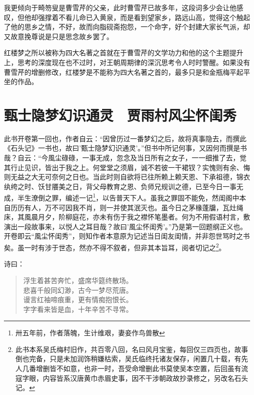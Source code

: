\documentclass[12pt,oneside]{book}
\newenvironment{shici}{
\begin{verse}
\centering\large\hspace{12pt}}
{\end{verse}}
\begin{document}
我更倾向于畸笏叟是曹雪芹的父亲，此时曹雪芹已故多年，这段词多少会让他感叹，但他却强撑着不看儿命已入黄泉，而是看到望家乡，路远山高，觉得这个触起了他的思乡之情，不好，故而向脂砚斋抱怨，一个命字，好个封建大家长气派，却又故意挽尊说是只是思念故乡罢了。


红楼梦之所以被称为四大名著之首就在于曹雪芹的文学功力和他的这个主题提升上，思考的深度现在也不过时，对王朝周期律的深沉思考令人时时警醒。如果没有曹雪芹的增删修改，红楼梦是不能称为四大名著之首的，最多只是和金瓶梅平起平坐的作品。




\setcounter{tocdepth}{2}    
\tableofcontents



\mainmatter


\chapter{甄士隐梦幻识通灵　贾雨村风尘怀闺秀}
此书开卷第一回也，作者自云：“因曾历过一番梦幻之后，故将真事隐去，而撰此《石头记》一书也，故曰’甄士隐梦幻识通灵’。”但书中所记何事，又因何而撰是书哉？自云：“今風尘碌碌，一事无成，忽念及当日所有之女子，一一细推了去，觉其行止见识，皆出于我之上。何堂堂之须眉，诚不若彼一干裙钗？实愧则有余、悔则无益之大无可奈何之日也。当此时则自欲将已往所赖上赖天恩、下承祖德，锦衣纨绔之时、饫甘餍美之日，背父母教育之恩、负师兄规训之德，已至今日一事无成，半生潦倒之罪，编述一记\footnote{卅五年前，作者落魄，生计维艰，妻妾作鸟兽散}，以告普天下人。虽我之罪固不能免，然闺阁中本自历历有人，万不可因我不肖，则一并使其泯灭也。虽今日之茅椽蓬牖，瓦灶绳床，其風晨月夕，阶柳庭花，亦未有伤于我之襟怀笔墨者。何为不用假语村言，敷演出一段故事来，以悦人之耳目哉？故曰’風尘怀闺秀’。”乃是第一回题纲正义也。开卷即云“風尘怀闺秀”，则知作者本意原为记述当日闺友闺情，并非怨世骂时之书矣。虽一时有涉于世态，然亦不得不叙者，但非其本旨耳，阅者切记之\footnote{此书本系吴氏梅村旧作，共百零八回，名曰风月宝鉴，每回仅三四页也，故事倒也完备，只是未加润饰稍嫌枯索，吴氏临终托诸友保存，闲置几十载，有先人几番增删皆不如意，也非一时，吾受命增删此书莫使吴本空置，后回虽有流寇字眼，内容皆系汉唐黄巾赤眉史事，因不干涉朝政故抄录修之，另改名石头记。}。

诗曰：

\begin{shici}
浮生着甚苦奔忙，盛席华筵终散场。\\
悲喜千般同幻渺，古今一梦尽荒唐。\\
谩言红袖啼痕重，更有情痴抱恨长。\\
字字看来皆是血，十年辛苦不寻常。
\end{shici}
\end{document}
